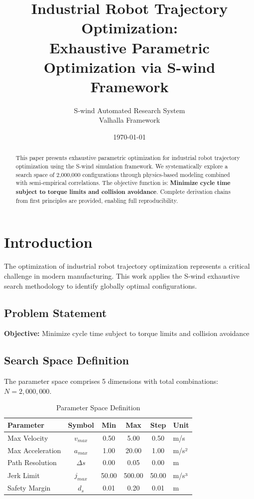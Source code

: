 \documentclass[11pt,twocolumn]{article}
\title{Industrial Robot Trajectory Optimization: \\Exhaustive Parametric Optimization via S-wind Framework}
\author{S-wind Automated Research System\\Valhalla Framework}
\date{\today}
\begin{document}
\maketitle

\begin{abstract}
This paper presents exhaustive parametric optimization for industrial robot trajectory optimization using the S-wind simulation framework.
We systematically explore a search space of 2,000,000 configurations through physics-based modeling
combined with semi-empirical correlations. The objective function is: \textbf{Minimize cycle time subject to torque limits and collision avoidance}.
Complete derivation chains from first principles are provided, enabling full reproducibility.
\end{abstract}

\section{Introduction}
The optimization of industrial robot trajectory optimization represents a critical challenge in modern manufacturing.
This work applies the S-wind exhaustive search methodology to identify globally optimal configurations.

\subsection{Problem Statement}
\textbf{Objective:} Minimize cycle time subject to torque limits and collision avoidance

\subsection{Search Space Definition}
The parameter space comprises 5 dimensions with total combinations: $N = 2,000,000$.

\begin{table}[h]
\centering
\caption{Parameter Space Definition}
\begin{tabular}{@{}lccccl@{}}
\toprule
Parameter & Symbol & Min & Max & Step & Unit \\
\midrule
Max Velocity & $v_{max}$ & 0.50 & 5.00 & 0.50 & m/s \\
Max Acceleration & $a_{max}$ & 1.00 & 20.00 & 1.00 & m/s² \\
Path Resolution & $\Delta s$ & 0.00 & 0.05 & 0.00 & m \\
Jerk Limit & $j_{max}$ & 50.00 & 500.00 & 50.00 & m/s³ \\
Safety Margin & $d_s$ & 0.01 & 0.20 & 0.01 & m \\
\bottomrule
\end{tabular}
\end{table}
\end{document}
